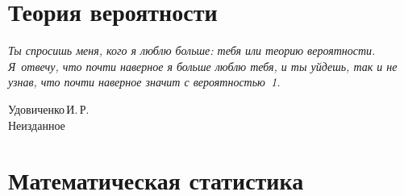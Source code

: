 \documentclass[12pt]{article}
\numberwithin{Th}{section}
\numberwithin{Def}{section}
\numberwithin{Lem}{section}
\numberwithin{St}{section}
\numberwithin{equation}{section}
\begin{document}
\tableofcontents
\newpage

\part{Теория вероятности}

\hfill\parbox{0.5\linewidth}{
\textit{Ты спросишь меня, кого я люблю больше: тебя или теорию вероятности. Я~отвечу, что почти наверное я больше люблю тебя, и ты уйдешь, так и не узнав, что почти наверное значит с вероятностью~1.}
\begin{flushright}
    Удовиченко\,И.\,Р. \\
    Неизданное
\end{flushright} 
}
\newpage








































\part{Математическая статистика}
\end{document}
